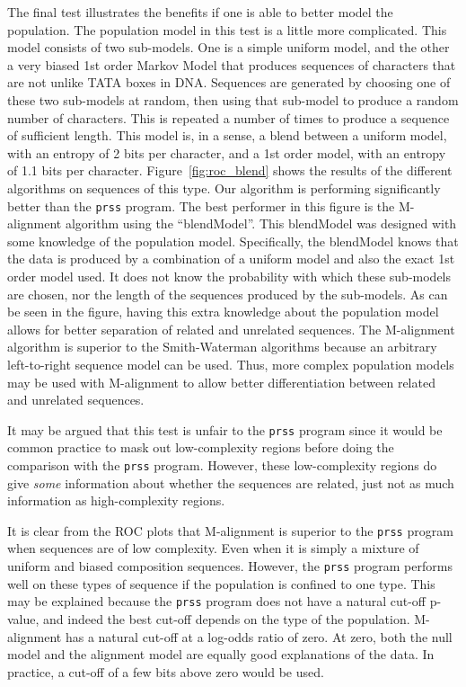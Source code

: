 \documentclass[letterpaper,11pt,oneside]{article}
\begin{document}
The final test illustrates the benefits if one is able to better model the
population.  The population model in this test is a little more complicated.
This model consists of two sub-models.  One is a simple uniform model, and the
other a very biased 1st order Markov Model that produces sequences of
characters that are not unlike TATA boxes in DNA.  Sequences are generated by
choosing one of these two sub-models at random, then using that sub-model to
produce a random number of characters.  This is repeated a number of times to
produce a sequence of sufficient length.  This model is, in a sense, a blend
between a uniform model, with an entropy of 2 bits per character, and a 1st
order model, with an entropy of 1.1 bits per character.
Figure~\ref{fig:roc_blend} shows the results of the different algorithms on
sequences of this type.  Our algorithm is performing significantly better than
the \verb!prss! program.  The best performer in this figure is the M-alignment
algorithm using the ``blendModel''.  This blendModel was designed with some
knowledge of the population model.  Specifically, the blendModel knows that
the data is produced by a combination of a uniform model and also the exact
1st order model used.  It does not know the probability with which these
sub-models are chosen, nor the length of the sequences produced by the
sub-models.  As can be seen in the figure, having this extra knowledge about
the population model allows for better separation of related and unrelated
sequences.  The M-alignment algorithm is superior to the Smith-Waterman
algorithms because an arbitrary left-to-right sequence model can be used.
Thus, more complex population models may be used with M-alignment to allow
better differentiation between related and unrelated sequences.


It may be argued that this test is unfair to the \verb!prss! program since it
would be common practice to mask out low-complexity regions before doing the
comparison with the \verb!prss! program.  However, these low-complexity
regions do give \emph{some} information about whether the sequences are
related, just not as much information as high-complexity regions.



It is clear from the ROC plots that M-alignment is superior to
the \verb!prss! program when sequences are of low complexity.  Even when it is
simply a mixture of uniform and biased composition sequences.  However, the
\verb!prss! program performs well on these types of sequence if the population
is confined to one type.  This may be explained because the \verb!prss!
program does not have a natural cut-off p-value, and indeed the best cut-off
depends on the type of the population.  M-alignment has a natural cut-off at a
log-odds ratio of zero.  At zero, both the null model and the alignment model
are equally good explanations of the data.  In practice, a cut-off of a few
bits above zero would be used.  
\end{document}
